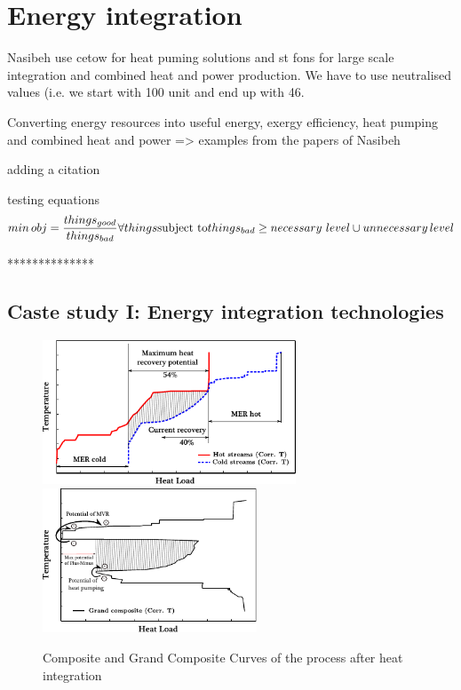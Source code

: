 \section{Energy integration}


Nasibeh use cetow for heat puming solutions and st fons for large scale integration and combined heat and power production. We have to use neutralised values (i.e. we start with 100 unit and end up with 46.


Converting energy resources into useful energy, exergy efficiency, heat pumping and combined heat and power => examples from the papers of Nasibeh

adding a citation \cite{Pouransari_2014}

testing equations
\begin{equation}
min \, obj= \frac{things_{good}}{things_{bad}} \forall things\\
\text{subject to}  \\
things_{bad}\ge necessary\,\, level \cup unnecessary \, level
\end{equation}

**************

\subsection{Caste study I: Energy integration technologies}

\begin{figure}[h]
        \begin{center}
        \includegraphics [height=4.3cm]{figures/EnergyIntegration/figMERcc.pdf} 
        \includegraphics [height=4.3cm]{figures/EnergyIntegration/figMERgcc.pdf}
        \caption{Composite and Grand Composite Curves of the process after heat integration}
        \label{fig1:mer}
        \end{center}
        \end{figure}
        
